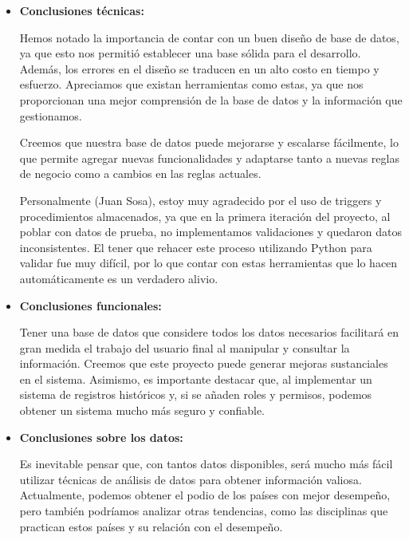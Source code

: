 \begin{itemize}
    \item \textbf{Conclusiones técnicas:}\vspace{0.5cm}
    
    Hemos notado la importancia de contar con un buen diseño de base de datos, ya que esto nos permitió establecer una base sólida para el desarrollo. Además, los errores en el diseño se traducen en un alto costo en tiempo y esfuerzo. Apreciamos que existan herramientas como estas, ya que nos proporcionan una mejor comprensión de la base de datos y la información que gestionamos. \vspace{0.5cm}

    Creemos que nuestra base de datos puede mejorarse y escalarse fácilmente, lo que permite agregar nuevas funcionalidades y adaptarse tanto a nuevas reglas de negocio como a cambios en las reglas actuales. \vspace{0.5cm}

    Personalmente (Juan Sosa), estoy muy agradecido por el uso de triggers y procedimientos almacenados, ya que en la primera iteración del proyecto, al poblar con datos de prueba, no implementamos validaciones y quedaron datos inconsistentes. El tener que rehacer este proceso utilizando Python para validar fue muy difícil, por lo que contar con estas herramientas que lo hacen automáticamente es un verdadero alivio. \vspace{0.5cm}

    \item \textbf{Conclusiones funcionales:} \vspace{0.5cm}
    
    Tener una base de datos que considere todos los datos necesarios facilitará en gran medida el trabajo del usuario final al manipular y consultar la información. Creemos que este proyecto puede generar mejoras sustanciales en el sistema. Asimismo, es importante destacar que, al implementar un sistema de registros históricos y, si se añaden roles y permisos, podemos obtener un sistema mucho más seguro y confiable. \vspace{0.5cm}

    \item \textbf{Conclusiones sobre los datos:} \vspace{0.5cm}
    
    Es inevitable pensar que, con tantos datos disponibles, será mucho más fácil utilizar técnicas de análisis de datos para obtener información valiosa. Actualmente, podemos obtener el podio de los países con mejor desempeño, pero también podríamos analizar otras tendencias, como las disciplinas que practican estos países y su relación con el desempeño. \vspace{0.5cm}


\end{itemize}
